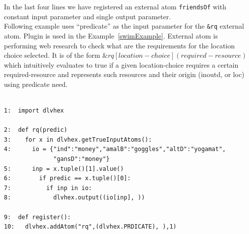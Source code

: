 \documentclass[14pt,a4paper, titlepage]{article}
\newcommand{\ext}[3]{\ensuremath{\&{#1}[#2](#3)}}
\begin{document}
In the last four lines we have registered an external atom 
\verb+friendsOf+ with constant input parameter and 
single output parameter. 
\bigskip \\
Following example uses ``predicate'' as the input parameter 
for the \verb+&rq+ external atom. Plugin is used in 
the Example~\ref{swimExample}. External atom is performing 
web research to check what are the requirements for the location choice selected. It is of the form 
$\ext{\mathit{rq}}{\mathit{location-choice}}
{\mathit{required-resource}}$ which intuitively evaluates 
to true if a given location-choice requires a certain 
required-resource and represents such resources and their 
origin (inoutd, or loc) using predicate need. 
\begin{exmp}
\label{predicateAsInput}
\begin{verbatim}

1:  import dlvhex 

2:  def rq(predic)
3:    for x in dlvhex.getTrueInputAtoms():
4:      io = {"ind":"money","amalB":"goggles","altD":"yogamat",
              "gansD":"money"}
5:      inp = x.tuple()[1].value()
6:        if predic == x.tuple()[0]:
7:          if inp in io:
8:            dlvhex.output((io[inp], ))

9:  def register():
10:   dlvhex.addAtom("rq",(dlvhex.PRDICATE), ),1)
\end{verbatim}
\end{exmp}
\end{document}
